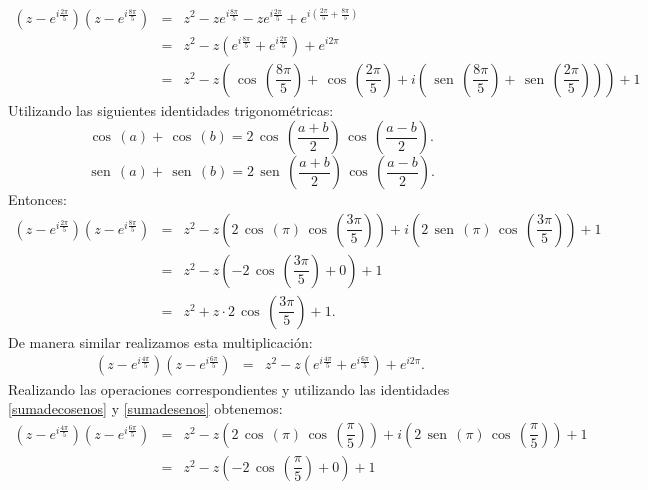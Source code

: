 \documentclass[twoside]{book}
\renewcommand{\sin}{\,\operatorname{sen}\,}
\renewcommand{\cos}{\,\operatorname{cos}\,}
\begin{document}
\begin{sol}
\begin{solucion}{}
\begin{eqnarray*}
            \left(z-e^{i\frac{2\pi}{5}}\right)\left(z-e^{i\frac{8\pi}{5}}\right)&=&z^2-ze^{i\frac{8\pi}{5}}-ze^{i\frac{2\pi}{5}}+e^{i(\frac{2\pi}{5}+\frac{8\pi}{5})}\\
            &=&z^2-z\left(e^{i\frac{8\pi}{5}}+e^{i\frac{2\pi}{5}}\right)+e^{i2\pi}\\
            &=&z^2-z\left(\cos\left(\dfrac{8\pi}{5}\right)+\cos\left(\dfrac{2\pi}{5}\right)+i\left(\sin\left(\dfrac{8\pi}{5}\right)+\sin\left(\dfrac{2\pi}{5}\right)\right)\right)+1
        \end{eqnarray*}
        Utilizando las siguientes identidades trigonom\'etricas:
        \begin{equation}\label{sumadecosenos}
            \cos(a)+\cos(b)=2\cos\left(\dfrac{a+b}{2}\right)\cos\left(\dfrac{a-b}{2}\right).
        \end{equation}
        \begin{equation}\label{sumadesenos}
            \sin(a)+\sin(b)=2\sin\left(\dfrac{a+b}{2}\right)\cos\left(\dfrac{a-b}{2}\right).
        \end{equation}
        Entonces:
        \begin{eqnarray*}
            \left(z-e^{i\frac{2\pi}{5}}\right)\left(z-e^{i\frac{8\pi}{5}}\right)&=&z^2-z\left(2\cos\left(\pi\right)\cos\left(\dfrac{3\pi}{5}\right)\right)+i\left(2\sin\left(\pi\right)\cos\left(\dfrac{3\pi}{5}\right)\right)+1\\
            &=&z^2-z\left(-2\cos\left(\dfrac{3\pi}{5}\right)+0\right)+1\\
            &=&z^2+z\cdot2\cos\left(\dfrac{3\pi}{5}\right)+1.
        \end{eqnarray*}
        De manera similar realizamos esta multiplicaci\'on:
        \begin{eqnarray*}
            \left(z-e^{i\frac{4\pi}{5}}\right)\left(z-e^{i\frac{6\pi}{5}}\right)&=&z^2-z\left(e^{i\frac{4\pi}{5}}+e^{i\frac{6\pi}{5}}\right)+e^{i2\pi}.
        \end{eqnarray*}
        Realizando las operaciones correspondientes y utilizando las identidades \eqref{sumadecosenos} y \eqref{sumadesenos} obtenemos:
        \begin{eqnarray*}
            \left(z-e^{i\frac{4\pi}{5}}\right)\left(z-e^{i\frac{6\pi}{5}}\right)&=&z^2-z\left(2\cos(\pi)\cos\left(\dfrac{\pi}{5}\right)\right)+i\left(2\sin(\pi)\cos\left(\dfrac{\pi}{5}\right)\right)+1\\
            &=&z^2-z\left(-2\cos\left(\dfrac{\pi}{5}\right)+0\right)+1\\

\end{eqnarray*}
\end{solucion}
\end{sol}
\end{document}

